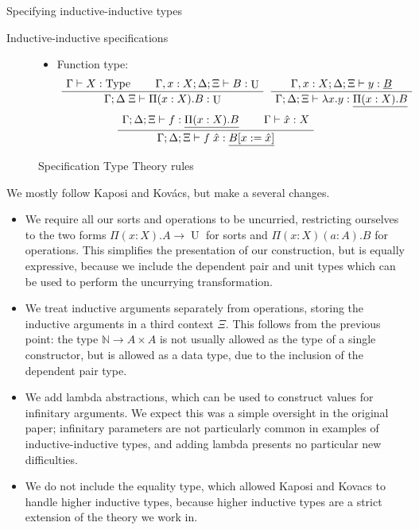 \documentclass[runningheads]{llncs}
\newenvironment{bprooftree}
  {\leavevmode\hbox\bgroup}
  {\DisplayProof\egroup}
\DeclareMathOperator{\USet}{Type}
\DeclareMathOperator{\UU}{U}
\newcommand{\N}{\mathbb{N}}
\newcommand{\tac}{\vdash}
\begin{document}
{\begin{section}{Specifying inductive-inductive types}
\begin{subsection}{Inductive-inductive specifications}
\begin{figure}[htpb]
\begin{itemize}
\begin{itemize}
            \item Function type:
            \[
                \begin{bprooftree}
                    \AxiomC{$\Gamma \tac X : \USet$}\AxiomC{$\Gamma , x : X ; \Delta ; \Xi \tac B : \UU$}\BinaryInfC{$\Gamma ; \Delta \; \Xi \tac \Pi(x : X).B : \UU$}
                \end{bprooftree}
                \begin{bprooftree}
                    \AxiomC{$\Gamma , x : X ; \Delta ; \Xi \tac y : \underline{B}$}\UnaryInfC{$\Gamma ; \Delta ; \Xi \tac \lambda x.y : \underline{\Pi(x : X).B}$}
                \end{bprooftree}
            \]
            \[
                \begin{bprooftree}
                    \AxiomC{$\Gamma ; \Delta ; \Xi \tac f : \underline{\Pi(x : X).B}$}\AxiomC{$\Gamma \tac \hat{x} : X$}\BinaryInfC{$\Gamma ; \Delta ; \Xi \tac f\; \hat{x} : \underline{B[x := \hat{x}]}$}
                \end{bprooftree}
            \]
    
        \end{itemize}
   
    \end{itemize}
    
    \caption{\label{spec-rules}Specification Type Theory rules}
\end{figure}

We mostly follow Kaposi and Kov\'acs, but make a several changes.
\begin{itemize}
    \item We require all our sorts and operations to be uncurried, restricting ourselves to the two forms $\Pi(x : X).A \to \UU$ for sorts and $\Pi(x : X)(a : A).B$ for operations. This simplifies the presentation of our construction, but is equally expressive, because we include the dependent pair and unit types which can be used to perform the uncurrying transformation.
    \item We treat inductive arguments separately from operations, storing the inductive arguments in a third context $\Xi$. This follows from the previous point: the type $\N \to A \times A$ is not usually allowed as the type of a single constructor, but is allowed as a data type, due to the inclusion of the dependent pair type.
    \item We add lambda abstractions, which can be used to construct values for infinitary arguments. We expect this was a simple oversight in the original paper; infinitary parameters are not particularly common in examples of inductive-inductive types, and adding lambda presents no particular new difficulties.
    \item We do not include the equality type, which allowed Kaposi and Kovacs to handle higher inductive types, because higher inductive types are a strict extension of the theory we work in. \citep{hit_extension_kraus_2018}
\end{itemize}


\end{subsection}
\end{section}}
\end{document}
